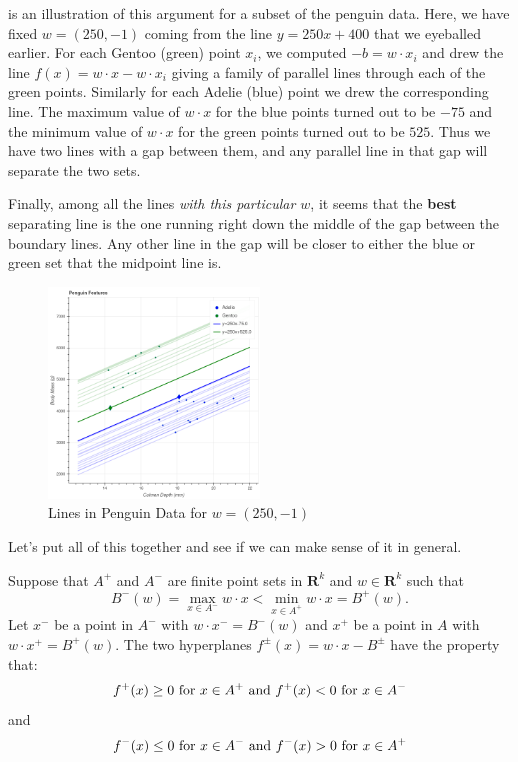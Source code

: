 \documentclass[
]{article}
\begin{document}
 is an illustration of this argument for a subset
of the penguin data. Here, we have fixed \(w=(250,-1)\) coming from the
line \(y=250x+400\) that we eyeballed earlier. For each Gentoo (green)
point \(x_{i}\), we computed \(-b=w\cdot x_{i}\) and drew the line
\(f(x) = w\cdot x - w\cdot x_{i}\) giving a family of parallel lines
through each of the green points. Similarly for each Adelie (blue) point
we drew the corresponding line. The maximum value of \(w\cdot x\) for
the blue points turned out to be \(-75\) and the minimum value of
\(w\cdot x\) for the green points turned out to be \(525\). Thus we have
two lines with a gap between them, and any parallel line in that gap
will separate the two sets.

Finally, among all the lines \emph{with this particular \(w\)}, it seems
that the \textbf{best} separating line is the one running right down the
middle of the gap between the boundary lines. Any other line in the gap
will be closer to either the blue or green set that the midpoint line
is.

\begin{figure}
\hypertarget{fig:penguinhwy2}{%
\centering
\includegraphics[width=0.5\textwidth,height=\textheight]{../img/penguinhwy2.png}
\caption{Lines in Penguin Data for
\(w=(250,-1)\)}\label{fig:penguinhwy2}
}
\end{figure}

Let's put all of this together and see if we can make sense of it in
general.

Suppose that \(A^{+}\) and \(A^{-}\) are finite point sets in
\(\mathbf{R}^{k}\) and \(w\in\mathbf{R}^{k}\) such that \[
B^{-}(w)=\max_{x\in A^{-}}w\cdot x < \min_{x\in A^{+}}w\cdot x=B^{+}(w).
\] Let \(x^{-}\) be a point in \(A^{-}\) with \(w\cdot x^{-}=B^{-}(w)\)
and \(x^{+}\) be a point in \(A\) with \(w\cdot x^{+}=B^{+}(w)\). The
two hyperplanes \(f^{\pm}(x) = w\cdot x - B^{\pm}\) have the property
that: \[
f^{+}(x)\ge 0\hbox{ for }x\in A^{+}\hbox{ and }f^{+}(x)<0\hbox{ for }x\in A^{-}
\] and \[
f^{-}(x)\le 0\hbox{ for }x\in A^{-}\hbox{ and }f^{-}(x)>0\hbox{ for }x\in A^{+}
\]
\end{document}
